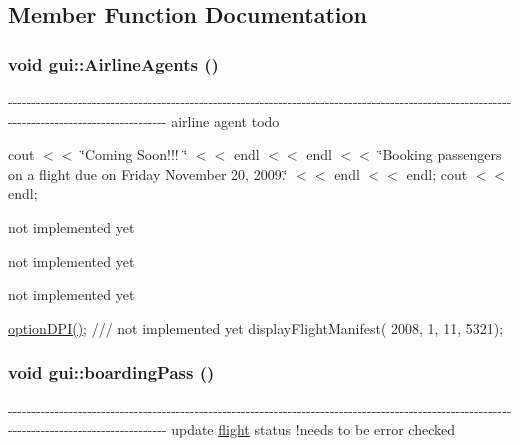 \subsection{Member Function Documentation}
\hypertarget{classgui_ae39757d1c6bdbfa938dbe3226a36febb}{
\subsubsection[{AirlineAgents}]{\setlength{\rightskip}{0pt plus 5cm}void gui::AirlineAgents ()}}
\label{classgui_ae39757d1c6bdbfa938dbe3226a36febb}
-\/-\/-\/-\/-\/-\/-\/-\/-\/-\/-\/-\/-\/-\/-\/-\/-\/-\/-\/-\/-\/-\/-\/-\/-\/-\/-\/-\/-\/-\/-\/-\/-\/-\/-\/-\/-\/-\/-\/-\/-\/-\/-\/-\/-\/-\/-\/-\/-\/-\/-\/-\/-\/-\/-\/-\/-\/-\/-\/-\/-\/-\/-\/-\/-\/-\/-\/-\/-\/-\/-\/-\/-\/-\/-\/-\/-\/-\/-\/-\/-\/-\/-\/-\/-\/-\/-\/-\/-\/-\/-\/-\/-\/-\/-\/-\/-\/-\/-\/-\/-\/-\/-\/-\/-\/-\/-\/-\/-\/-\/-\/-\/-\/-\/-\/-\/-\/-\/-\/-\/-\/-\/-\/-\/-\/-\/-\/-\/-\/-\/-\/-\/-\/-\/-\/-\/-\/-\/-\/-\/-\/-\/ airline agent todo 

cout $<$$<$ \char`\"{}Coming Soon!!! \char`\"{} $<$$<$ endl $<$$<$ endl $<$$<$ \char`\"{}Booking passengers on a flight due on Friday November 20, 2009.\char`\"{} $<$$<$ endl $<$$<$ endl; cout $<$$<$ endl;

not implemented yet

not implemented yet

not implemented yet

\hyperlink{classgui_ad59aed173b2688436ed753da2d0e903f}{optionDPI()}; /// not implemented yet displayFlightManifest( 2008, 1, 11, 5321); \hypertarget{classgui_abe0e499ac3e81760d8a1e4d1fdbc3510}{
\subsubsection[{boardingPass}]{\setlength{\rightskip}{0pt plus 5cm}void gui::boardingPass ()}}
\label{classgui_abe0e499ac3e81760d8a1e4d1fdbc3510}
-\/-\/-\/-\/-\/-\/-\/-\/-\/-\/-\/-\/-\/-\/-\/-\/-\/-\/-\/-\/-\/-\/-\/-\/-\/-\/-\/-\/-\/-\/-\/-\/-\/-\/-\/-\/-\/-\/-\/-\/-\/-\/-\/-\/-\/-\/-\/-\/-\/-\/-\/-\/-\/-\/-\/-\/-\/-\/-\/-\/-\/-\/-\/-\/-\/-\/-\/-\/-\/-\/-\/-\/-\/-\/-\/-\/-\/-\/-\/-\/-\/-\/-\/-\/-\/-\/-\/-\/-\/-\/-\/-\/-\/-\/-\/-\/-\/-\/-\/-\/-\/-\/-\/-\/-\/-\/-\/-\/-\/-\/-\/-\/-\/-\/-\/-\/-\/-\/-\/-\/-\/-\/-\/-\/-\/-\/-\/-\/-\/-\/-\/-\/-\/-\/-\/-\/-\/-\/-\/-\/-\/-\/ update \hyperlink{classflight}{flight} status !needs to be error checked 

